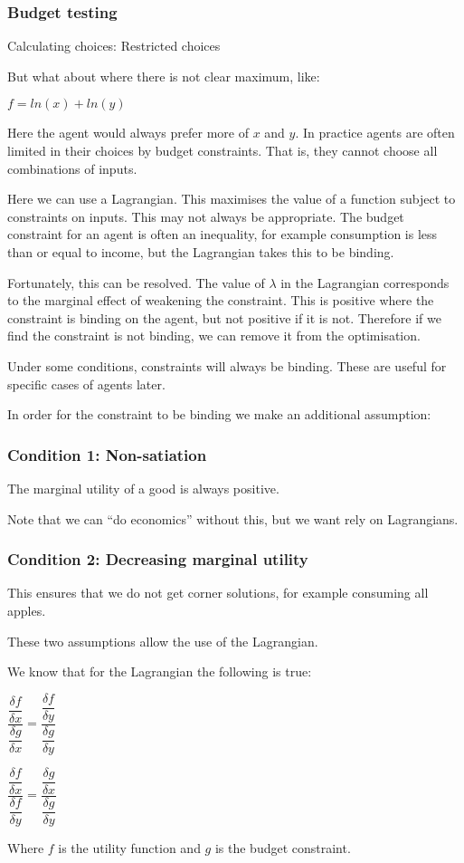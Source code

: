
\subsubsection{Budget testing}

Calculating choices: Restricted choices

But what about where there is not clear maximum, like:

\(f=ln(x)+ln(y)\)

Here the agent would always prefer more of \(x\) and \(y\). In practice agents are often limited in their choices by budget constraints. That is, they cannot choose all combinations of inputs.

Here we can use a Lagrangian. This maximises the value of a function subject to constraints on inputs. This may not always be appropriate. The budget constraint for an agent is often an inequality, for example consumption is less than or equal to income, but the Lagrangian takes this to be binding.

Fortunately, this can be resolved. The value of \(\lambda \) in the Lagrangian corresponds to the marginal effect of weakening the constraint. This is positive where the constraint is binding on the agent, but not positive if it is not. Therefore if we find the constraint is not binding, we can remove it from the optimisation.

Under some conditions, constraints will always be binding. These are useful for specific cases of agents later.

In order for the constraint to be binding we make an additional assumption:

\subsubsection{Condition 1: Non-satiation}

The marginal utility of a good is always positive.

Note that we can “do economics” without this, but we want rely on Lagrangians.

\subsubsection{Condition 2: Decreasing marginal utility}

This ensures that we do not get corner solutions, for example consuming all apples.

These two assumptions allow the use of the Lagrangian.

We know that for the Lagrangian the following is true:

\(\dfrac{\dfrac{\delta f}{\delta x}}{\dfrac{\delta g}{\delta x}}=\dfrac{\dfrac{\delta f}{\delta y}}{\dfrac{\delta g}{\delta y}}\)

\(\dfrac{\dfrac{\delta f}{\delta x}}{\dfrac{\delta f}{\delta y}}=\dfrac{\dfrac{\delta g}{\delta x}}{\dfrac{\delta g}{\delta y}}\)

Where \(f\) is the utility function and \(g\) is the budget constraint.

